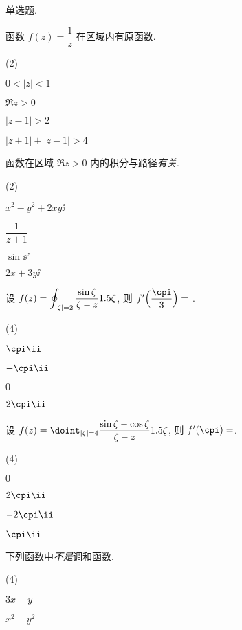 
\begin{homework}
  \item 单选题.
  \begin{homework}
    \item 函数 $f(z)=\dfrac 1z$ 在区域\fillbrace{}内有原函数.
      \begin{exchoice}(2)
        \item $0<|z|<1$
        \item $\Re z>0$
        \item $|z-1|>2$
        \item $|z+1|+|z-1|>4$
      \end{exchoice}
    \item 函数\fillbrace{}在区域 $\Re z>0$ 内的积分与路径\emph{有关}.
      \begin{exchoice}(2)
        \item $x^2-y^2+2xy\ii$
        \item $\dfrac1{z+1}$
        \item $\sin\ee^z$
        \item $2x+3y\ii$
      \end{exchoice}
    \item 设 $\displaystyle f(z)=\oint_{|\zeta|=2}\frac{\sin \zeta}{\zeta-z}1.5 \zeta$, 则 $f'\Bigl(\dfrac\cpi3\Bigr)=$ \fillbrace{}.
      \begin{exchoice}(4)
        \item $\cpi\ii $
        \item $-\cpi\ii $
        \item $0$
        \item $2\cpi\ii $
      \end{exchoice}
    \item 设 $f(z)=\doint_{|\zeta|=4}\dfrac{\sin\zeta-\cos\zeta}{\zeta-z}\d\zeta$, 则 $f'(\cpi)=$\fillbrace{}.
      \begin{exchoice}(4)
        \item $0$
        \item $2\cpi\ii $
        \item $-2\cpi\ii $
        \item $\cpi\ii $
      \end{exchoice}
    \item 下列函数中\fillbrace{}\emph{不是}调和函数.
      \begin{exchoice}(4)
        \item $3x-y$
        \item $x^2-y^2$

\end{exchoice}
\end{homework}
\end{homework}
